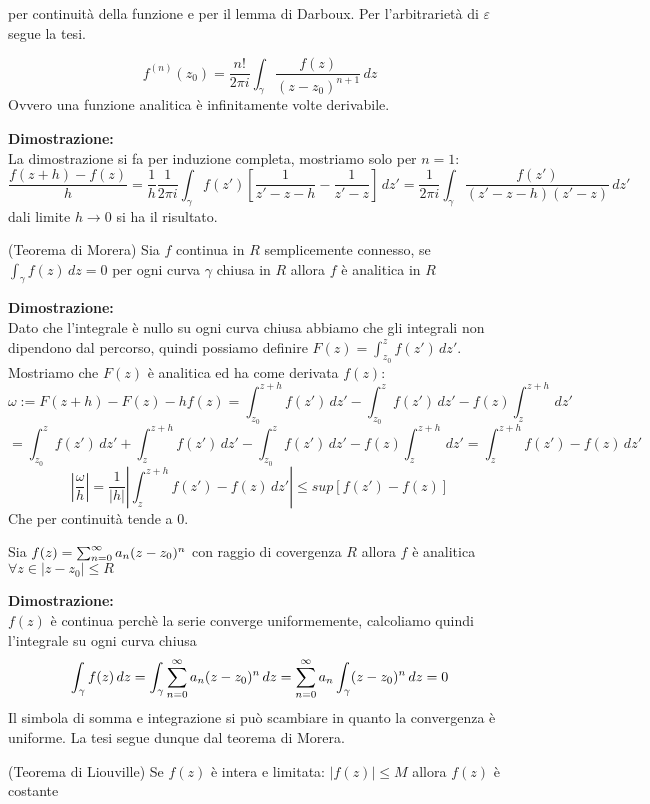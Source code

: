 per continuità della funzione e per il lemma di Darboux. Per l'arbitrarietà di $\varepsilon$ segue la tesi.
\begin{coro}
\[f^{(n)}(z_0) = \frac{n!}{2\pi i}\int_\gamma \frac{f(z)}{(z-z_0)^{n+1}}\, dz\] 
Ovvero una funzione analitica è infinitamente volte derivabile.
\end{coro}
\hspace{-1.6em}\textbf{Dimostrazione:}\\
La dimostrazione si fa per induzione completa, mostriamo solo per $n=1$:
\[\frac{f(z+h)-f(z)}{h} = \frac{1}{h}\frac{1}{2\pi i}\int_\gamma f(z')\left[\frac{1}{z'-z-h}-\frac{1}{z'-z}\right] \, dz' = \frac{1}{2\pi i}\int_\gamma \frac{f(z')}{(z'-z-h)(z'-z)} \, dz'\]
dali limite $h\to 0$ si ha il risultato.
\begin{thm}
(Teorema di Morera) Sia $f$ continua in $R$ semplicemente connesso, se $\int_\gamma f(z)\, dz = 0$ per ogni curva $\gamma$ chiusa in $R$ allora $f$ è analitica in $R$
\end{thm}
\hspace{-1.6em}\textbf{Dimostrazione:}\\
Dato che l'integrale è nullo su ogni curva chiusa abbiamo che gli integrali non dipendono dal percorso, quindi possiamo definire $F(z) = \int_{z_0}^z f(z')\, dz'$. Mostriamo che $F(z)$ è analitica ed ha come derivata $f(z)$:
\[\omega:= F(z+h)-F(z) -hf(z)= \int_{z_0}^{z+h} f(z')\, dz' - \int_{z_0}^z f(z')\, dz' - f(z)\int_z^{z+h}\,dz'\] 
\[= \int_{z_0}^{z} f(z')\, dz' +\int_{z}^{z+h} f(z')\, dz' - \int_{z_0}^z f(z')\, dz' - f(z)\int_z^{z+h}\,dz' = \int_{z}^{z+h} f(z')-f(z)\, dz'\]
\[\left|\frac{\omega}{h}\right| = \frac{1}{|h|}\left|\int_{z}^{z+h} f(z')-f(z)\, dz'\right|\leq sup[f(z')-f(z)]\]
Che per continuità tende a 0.\\
\begin{coro}
Sia $f(z) = \sum_{n=0}^\infty a_n (z-z_0)^n$ con raggio di covergenza $R$ allora $f$ è analitica $\forall z \in |z-z_0|\leq R $
\end{coro}
\hspace{-1.6em}\textbf{Dimostrazione:}\\
$f(z)$ è continua perchè la serie converge uniformemente, calcoliamo quindi  l'integrale su ogni curva chiusa
\[\int_\gamma f(z)\, dz = \int_\gamma \sum_{n=0}^\infty a_n (z-z_0)^n\,dz =\sum_{n=0}^\infty a_n \int_\gamma(z-z_0)^n\,dz = 0  \]
Il simbola di somma e integrazione si può scambiare in quanto la convergenza è uniforme. La tesi segue dunque dal teorema di Morera.\\
\begin{thm}
(Teorema di Liouville) Se $f(z)$ è intera e limitata: $|f(z)|\leq M$ allora $f(z)$ è costante 
\end{thm}
